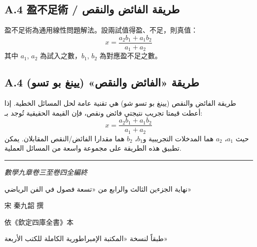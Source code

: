 \documentclass[11pt,a4paper]{article}
\begin{document}
\noindent
\begin{minipage}[t]{0.48\textwidth}
\subsection*{A.4 盈不足術 / طريقة الفائض والنقص}

盈不足術為通用線性問題解法。設兩試值得盈、不足，則真值：
\[
x = \frac{a_2b_1 + a_1b_2}{a_1 + a_2}
\]
其中 $a_1$, $a_2$ 為試入之數，$b_1$, $b_2$ 為對應盈不足之數。
\end{minipage}
\hfill
\begin{minipage}[t]{0.48\textwidth}
\arabicfont\beginR
\subsection*{A.4 طريقة «الفائض والنقص» (يينغ بو تسو)}

طريقة الفائض والنقص (يينغ بو تسو شو) هي تقنية عامة لحل المسائل الخطية. إذا أعطت قيمتا تجريب نتيجتي فائض ونقص، فإن القيمة الحقيقية تُوجد بـ:
\[
x = \frac{a_2b_1 + a_1b_2}{a_1 + a_2}
\]
حيث $a_1$، $a_2$ هما المدخلات التجريبية و$b_1$، $b_2$ هما مقدارا الفائض/النقص المقابلان. يمكن تطبيق هذه الطريقة على مجموعة واسعة من المسائل العملية.
\endR
\end{minipage}

\vspace{1cm}

\begin{center}
\rule{0.3\textwidth}{0.4pt}

\vspace{0.3cm}

{\large\itshape 數學九章卷三至卷四全編終}

\vspace{0.2cm}

{\arabicfont\beginR\large نهاية الجزءين الثالث والرابع من «تسعة فصول في الفن الرياضي»\endR}

\vspace{0.3cm}

{\small 宋 \quad 秦九韶 \quad 撰}

\vspace{0.2cm}

{\small\color{notecolor} 依《欽定四庫全書》本}

\vspace{0.2cm}

{\small\arabicfont\beginR\color{notecolor}
طبقاً لنسخة «المكتبة الإمبراطورية الكاملة للكتب الأربعة»
\endR}
\end{center}
\end{document}
